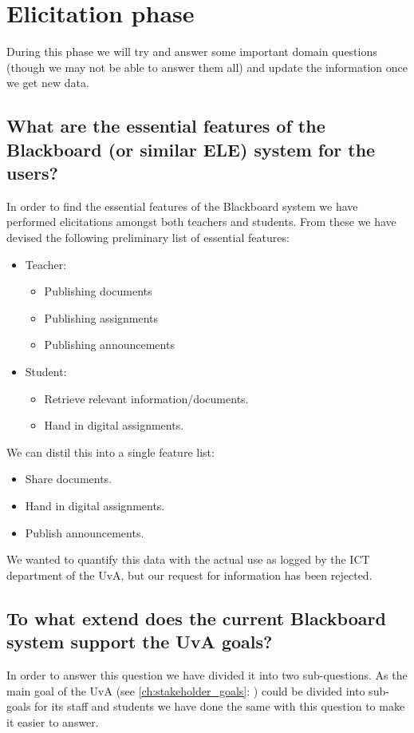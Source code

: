 \chapter{Elicitation phase}\label{ch:elicitation}
During this phase we will try and answer some important domain questions (though we may not be able to answer them all) and update the information once we get new data.

\section{What are the essential features of the Blackboard (or similar ELE) system for the users?}
In order to find the essential features of the Blackboard system we have performed elicitations amongst both teachers and students. From these we have devised the following preliminary list of essential features:

\begin{itemize}
	\item Teacher:
	\begin{itemize}
		\item Publishing documents
		\item Publishing assignments
		\item Publishing announcements
	\end{itemize}
	
	\item Student:
	\begin{itemize}
		\item Retrieve relevant information/documents.
		\item Hand in digital assignments.
	\end{itemize}
\end{itemize}

We can distil this into a single feature list:
\begin{itemize}
	\item Share documents.
	\item Hand in digital assignments.
	\item Publish announcements.
\end{itemize}
We wanted to quantify this data with the actual use as logged by the ICT department of the UvA, but our request for information has been rejected.

\section{To what extend does the current Blackboard system support the UvA goals?} \label{uva_goal_question}
In order to answer this question we have divided it into two sub-questions. As the main goal of the UvA (see \ref{ch:stakeholder_goals}: ) could be divided into sub-goals for its staff and students we have done the same with this question to make it easier to answer.

